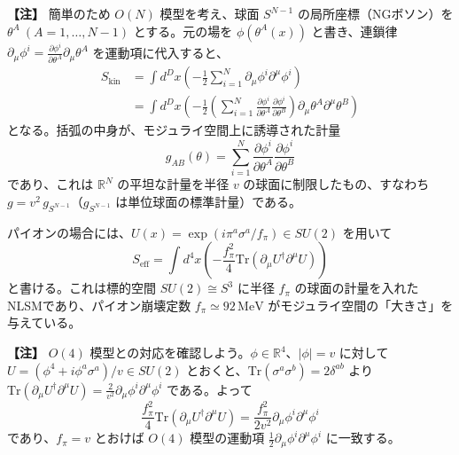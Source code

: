 \documentclass[uplatex, dvipdfmx, book]{jsbook}
\newenvironment{note}{\vspace{1ex}\par\footnotesize\noindent\textbf{【注】}}{\par\vspace{1ex}}
\begin{document}
\begin{note}
簡単のため $O(N)$ 模型を考え、球面 $S^{N-1}$ の局所座標（NGボソン）を $\theta^A \ (A=1, \dots, N-1)$ とする。元の場を $\phi(\theta^A(x))$ と書き、連鎖律 $\partial_\mu \phi^i = \frac{\partial \phi^i}{\partial \theta^A} \partial_\mu \theta^A$ を運動項に代入すると、
\begin{align*}
    S_{\text{kin}} &= \int d^D x \left( - \frac{1}{2} \sum_{i=1}^N \partial_\mu \phi^i \partial^\mu \phi^i \right) \\
    &= \int d^D x \left( - \frac{1}{2} \left( \sum_{i=1}^N \frac{\partial \phi^i}{\partial \theta^A} \frac{\partial \phi^i}{\partial \theta^B} \right) \partial_\mu \theta^A \partial^\mu \theta^B \right)
\end{align*}
となる。括弧の中身が、モジュライ空間上に誘導された計量
\begin{equation*}
    g_{AB}(\theta) = \sum_{i=1}^N \frac{\partial \phi^i}{\partial \theta^A} \frac{\partial \phi^i}{\partial \theta^B}
\end{equation*}
であり、これは $\mathbb{R}^N$ の平坦な計量を半径 $v$ の球面に制限したもの、すなわち $g = v^2\, g_{S^{N-1}}$（$g_{S^{N-1}}$ は単位球面の標準計量）である。
\end{note}

パイオンの場合には、$U(x) = \exp(i\pi^a\sigma^a/f_\pi) \in SU(2)$ を用いて
\begin{equation}
    S_{\text{eff}} = \int d^4x \left( -\frac{f_\pi^2}{4}\mathrm{Tr}(\partial_\mu U^\dagger \partial^\mu U) \right)
\end{equation}
と書ける。これは標的空間 $SU(2) \cong S^3$ に半径 $f_\pi$ の球面の計量を入れたNLSMであり、パイオン崩壊定数 $f_\pi \simeq 92\,\text{MeV}$ がモジュライ空間の「大きさ」を与えている。

\begin{note}
$O(4)$ 模型との対応を確認しよう。$\phi \in \mathbb{R}^4$、$|\phi| = v$ に対して $U = (\phi^4 + i\phi^a\sigma^a)/v \in SU(2)$ とおくと、$\mathrm{Tr}(\sigma^a\sigma^b) = 2\delta^{ab}$ より $\mathrm{Tr}(\partial_\mu U^\dagger\partial^\mu U) = \frac{2}{v^2}\partial_\mu\phi^i\partial^\mu\phi^i$ である。よって
\begin{equation*}
    \frac{f_\pi^2}{4}\mathrm{Tr}(\partial_\mu U^\dagger \partial^\mu U) = \frac{f_\pi^2}{2v^2}\partial_\mu\phi^i\partial^\mu\phi^i
\end{equation*}
であり、$f_\pi = v$ とおけば $O(4)$ 模型の運動項 $\frac{1}{2}\partial_\mu\phi^i\partial^\mu\phi^i$ に一致する。
\end{note}
\end{document}
